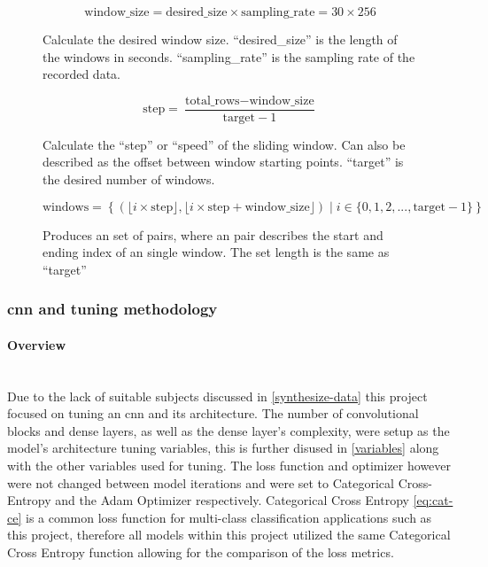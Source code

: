 \documentclass[12pt]{article}
\begin{document}
\begin{figure}[H]
\[ \text{{window\_size}} = \text{{desired\_size}} \times \text{{sampling\_rate}} = 30 \times 256   \]
\caption{Calculate the desired window size. ``desired\_size'' is the length of the windows in seconds. ``sampling\_rate'' is the sampling rate of the recorded data.}
\label{eq:window-size}
\end{figure}


\begin{figure}[H]
\[ \text{{step}} = \frac{{\text{{total\_rows}} - \text{{window\_size}}}}{{\text{{target}} - 1}}  \]
\caption{Calculate the ``step'' or ``speed'' of the sliding window. Can also be described as the offset between window starting points. ``target'' is the desired number of windows.}
\label{eq:step}
\end{figure}

\begin{figure}[H]
\[ \text{{windows}} = \left\{ \left( \lfloor i \times \text{{step}} \rfloor, \lfloor i \times \text{{step}} + \text{{window\_size}} \rfloor \right) \mid i \in \{0, 1, 2, ..., \text{{target}} - 1\} \right\}  \]
\caption{Produces an set of pairs, where an pair describes the start and ending index of an single window. The set length is the same as ``target''}
\label{eq:windows}
\end{figure}

\subsubsection{\acrfull{cnn} and tuning methodology}

\paragraph{Overview}\mbox{}\\

Due to the lack of suitable subjects discussed in \ref{synthesize-data} this project focused on tuning an \acrshort{cnn} and its architecture. The number of convolutional blocks and dense layers, as well as the dense layer's complexity, were setup as the model's architecture tuning variables, this is further disused in \ref{variables} along with the other variables used for tuning. The loss function and optimizer however were not changed between model iterations and were set to Categorical Cross-Entropy and the Adam Optimizer respectively. Categorical Cross Entropy \ref{eq:cat-ce} is a common loss function for multi-class classification applications such as this project, therefore all models within this project utilized the same Categorical Cross Entropy function allowing for the comparison of the loss metrics.
\end{document}

